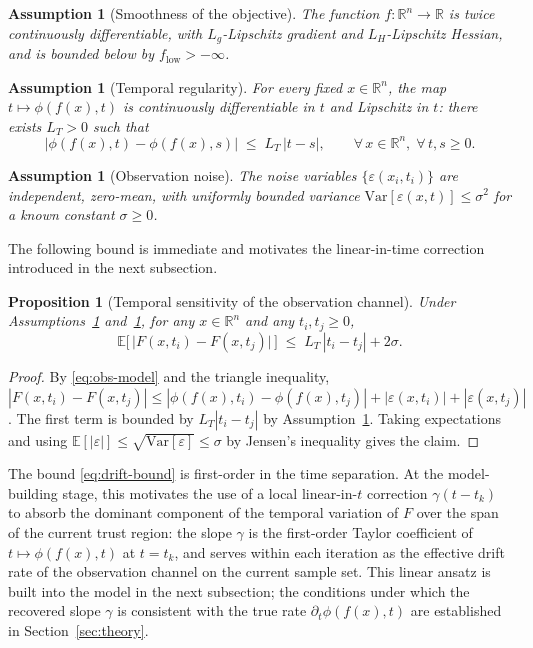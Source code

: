 \documentclass[11pt,a4paper]{article}
\newcommand{\R}{\mathbb{R}}
\newtheorem{proposition}[theorem]{Proposition}
\newtheorem{assumption}[theorem]{Assumption}
\begin{document}
\begin{assumption}[Smoothness of the objective]\label{ass:f}
The function $f:\R^n\to\R$ is twice continuously differentiable, with
$L_g$-Lipschitz gradient and $L_H$-Lipschitz Hessian, and is bounded
below by $f_{\mathrm{low}}>-\infty$.
\end{assumption}

\begin{assumption}[Temporal regularity]\label{ass:T}
For every fixed $x\in\R^n$, the map $t\mapsto \phi(f(x), t)$ is
continuously differentiable in $t$ and Lipschitz in $t$: there exists
$L_T>0$ such that
\begin{equation}\label{eq:LT}
  \bigl|\phi(f(x), t) - \phi(f(x), s)\bigr| \;\le\; L_T\,|t - s|,
  \qquad \forall\,x\in\R^n,\;\forall\,t, s \ge 0.
\end{equation}
\end{assumption}

\begin{assumption}[Observation noise]\label{ass:noise}
The noise variables $\{\varepsilon(x_i, t_i)\}$ are independent,
zero-mean, with uniformly bounded variance
$\mathrm{Var}[\varepsilon(x, t)] \le \sigma^2$ for a known constant
$\sigma\ge 0$.
\end{assumption}

The following bound is immediate and motivates the linear-in-time
correction introduced in the next subsection.

\begin{proposition}[Temporal sensitivity of the observation channel]
\label{prop:drift-bound}
Under Assumptions~\ref{ass:T} and~\ref{ass:noise}, for any
$x\in\R^n$ and any $t_i, t_j \ge 0$,
\begin{equation}\label{eq:drift-bound}
  \mathbb{E}\bigl[\,\bigl|F(x,t_i) - F(x,t_j)\bigr|\,\bigr]
  \;\le\; L_T\,|t_i - t_j| + 2\sigma.
\end{equation}
\end{proposition}

\begin{proof}
By \eqref{eq:obs-model} and the triangle inequality,
$|F(x,t_i) - F(x,t_j)| \le |\phi(f(x), t_i) - \phi(f(x), t_j)| +
|\varepsilon(x,t_i)| + |\varepsilon(x,t_j)|$.  The first term is
bounded by $L_T|t_i - t_j|$ by Assumption~\ref{ass:T}.  Taking
expectations and using $\mathbb{E}[|\varepsilon|] \le
\sqrt{\mathrm{Var}[\varepsilon]} \le \sigma$ by Jensen's inequality
gives the claim.
\end{proof}

The bound \eqref{eq:drift-bound} is first-order in the time
separation.  At the model-building stage, this motivates the use of a
local linear-in-$t$ correction $\gamma(t-t_k)$ to absorb the dominant
component of the temporal variation of $F$ over the span of the
current trust region: the slope $\gamma$ is the first-order Taylor
coefficient of $t\mapsto \phi(f(x), t)$ at $t = t_k$, and serves
within each iteration as the effective drift rate of the observation
channel on the current sample set.  This linear ansatz is built into
the model in the next subsection; the conditions under which the
recovered slope $\gamma$ is consistent with the true rate
$\partial_t \phi(f(x), t)$ are established in
Section~\ref{sec:theory}.
\end{document}
